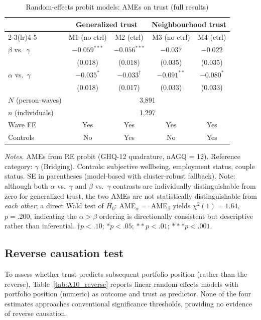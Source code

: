 \documentclass[12pt, a4paper]{article}
\newcommand{\tablenote}[1]{\vspace{4pt}\par\footnotesize\textit{Notes.} #1}
\begin{document}
\begin{table}[H]
\centering
\caption{Random-effects probit models: AMEs on trust (full results)}
\label{tab:A9_reprobit}
\small
\begin{tabular}{lcccc}
\hline\hline
  & \multicolumn{2}{c}{Generalized trust} & \multicolumn{2}{c}{Neighbourhood trust} \\
  \cmidrule(lr){2-3}\cmidrule(lr){4-5}
  & M1 (no ctrl) & M2 (ctrl) & M3 (no ctrl) & M4 (ctrl) \\
\hline
  $\beta$ vs.\ $\gamma$ & $-0.059^{***}$ & $-0.056^{***}$ & $-0.037$       & $-0.022$      \\
                        & (0.018)       & (0.018)       & (0.035)        & (0.035)       \\[4pt]
  $\alpha$ vs.\ $\gamma$& $-0.035^{*}$  & $-0.033^{\dagger}$ & $-0.091^{**}$ & $-0.080^{*}$ \\
                        & (0.018)       & (0.017)       & (0.033)        & (0.033)       \\
\hline
  $N$ (person-waves)    & \multicolumn{4}{c}{3,891} \\
  $n$ (individuals)     & \multicolumn{4}{c}{1,297} \\
  Wave FE               & Yes & Yes & Yes & Yes \\
  Controls              & No  & Yes & No  & Yes \\
\hline\hline
\end{tabular}
\tablenote{AMEs from RE probit (GHQ-12 quadrature, nAGQ = 12).
Reference category: $\gamma$ (Bridging). Controls: subjective wellbeing,
employment status, couple status.
SE in parentheses (model-based with cluster-robust fallback).
Note: although both $\alpha$ vs.\ $\gamma$ and $\beta$ vs.\ $\gamma$ contrasts
are individually distinguishable from zero for generalized trust, the two AMEs
are not statistically distinguishable from \textit{each other}; a direct Wald
test of $H_0$: AME$_\alpha =$ AME$_\beta$ yields $\chi^2(1) = 1.64$, $p = .200$,
indicating the $\alpha > \beta$ ordering is directionally consistent but
descriptive rather than inferential.
$\dagger p<.10$; $* p<.05$; $** p<.01$; $*** p<.001$.}
\end{table}

\subsection{Reverse causation test}

To assess whether trust predicts subsequent portfolio position (rather than
the reverse), Table~\ref{tab:A10_reverse} reports linear random-effects
models with portfolio position (numeric) as outcome and trust as predictor.
None of the four estimates approaches conventional significance thresholds,
providing no evidence of reverse causation.
\end{document}
